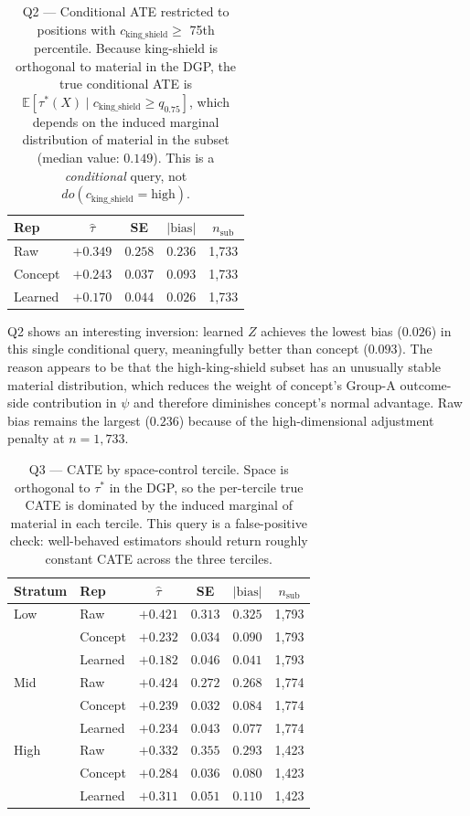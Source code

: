 \documentclass{article}
\begin{document}
\begin{table}[h]
\caption{Q2 — Conditional ATE restricted to positions with
$c_{\text{king\_shield}} \geq$ 75th percentile. Because king-shield is
orthogonal to material in the DGP, the true conditional ATE is
$\mathbb{E}[\tau^*(X) \mid c_{\text{king\_shield}} \geq q_{0.75}]$, which
depends on the induced marginal distribution of material in the subset
(median value: $0.149$). This is a \emph{conditional} query, not
$do(c_{\text{king\_shield}}=\text{high})$.}
\label{tab:q2}
\centering
\small
\begin{tabular}{lcccc}
\toprule
Rep & $\hat{\tau}$ & SE & $|\text{bias}|$ & $n_{\text{sub}}$ \\
\midrule
Raw     & $+0.349$ & $0.258$ & $0.236$ & 1,733 \\
Concept & $+0.243$ & $0.037$ & $0.093$ & 1,733 \\
Learned & $+0.170$ & $0.044$ & $0.026$ & 1,733 \\
\bottomrule
\end{tabular}
\end{table}

Q2 shows an interesting inversion: learned $Z$ achieves the lowest bias
($0.026$) in this single conditional query, meaningfully better than concept
($0.093$). The reason appears to be that the high-king-shield subset has an
unusually stable material distribution, which reduces the weight of
concept's Group-A outcome-side contribution in $\psi$ and therefore
diminishes concept's normal advantage. Raw bias remains the largest
($0.236$) because of the high-dimensional adjustment penalty at $n=1{,}733$.

\begin{table}[h]
\caption{Q3 — CATE by space-control tercile. Space is orthogonal to $\tau^*$
in the DGP, so the per-tercile true CATE is dominated by the induced
marginal of material in each tercile. This query is a false-positive check:
well-behaved estimators should return roughly constant CATE across the three
terciles.}
\label{tab:q3}
\centering
\small
\begin{tabular}{llcccc}
\toprule
Stratum & Rep & $\hat{\tau}$ & SE & $|\text{bias}|$ & $n_{\text{sub}}$ \\
\midrule
Low  & Raw     & $+0.421$ & $0.313$ & $0.325$ & 1,793 \\
     & Concept & $+0.232$ & $0.034$ & $0.090$ & 1,793 \\
     & Learned & $+0.182$ & $0.046$ & $0.041$ & 1,793 \\
\midrule
Mid  & Raw     & $+0.424$ & $0.272$ & $0.268$ & 1,774 \\
     & Concept & $+0.239$ & $0.032$ & $0.084$ & 1,774 \\
     & Learned & $+0.234$ & $0.043$ & $0.077$ & 1,774 \\
\midrule
High & Raw     & $+0.332$ & $0.355$ & $0.293$ & 1,423 \\
     & Concept & $+0.284$ & $0.036$ & $0.080$ & 1,423 \\
     & Learned & $+0.311$ & $0.051$ & $0.110$ & 1,423 \\
\bottomrule
\end{tabular}
\end{table}
\end{document}
